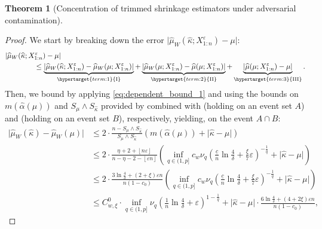 \documentclass{article}
\theoremstyle{plain}
\newtheorem{theorem}{Theorem}[section]
\theoremstyle{definition}
\begin{document}
\begin{appendix}
\begin{theorem}[Concentration of trimmed shrinkage estimators under adversarial contamination]
\end{theorem}
\begin{proof}
  We start by breaking down the error \( \lvert \widehat{\mu }_W(\widehat{\kappa };X_{1:n}^\varepsilon  ) - \mu  \rvert  \):   
  \begin{align*}
    &\lvert \widehat{\mu }_W(\widehat{\kappa };X_{1:n}^\varepsilon  )  -\mu  \rvert  \\
    &\hspace{4em}\le \underbrace{\lvert \widehat{\mu }_W(\widehat{\kappa};X_{1:n}^\varepsilon  ) -   \widehat{\mu }_W(\mu ;X_{1:n}^\varepsilon )  \rvert }_{\hypertarget{term:1}{\text{\MakeUppercase{\romannumeral 1}}}}+ \underbrace{\lvert\widehat{\mu }_W(\mu ;X_{1:n}^\varepsilon ) - \widehat{\mu }(\mu ;X_{1:n}^\varepsilon )  \rvert}_{\hypertarget{term:2}{\text{\MakeUppercase{\romannumeral 2}}}} + \underbrace{\lvert \widehat{\mu }(\mu ; X_{1:n}^\varepsilon ) -\mu  \rvert }_{\hypertarget{term:3}{\text{\MakeUppercase{\romannumeral 3}}}}.
  \end{align*} 
  Then, we bound \hyperlink{1}{} by applying \eqref{eq:dependent_bound_1} and using the bounds on \( m(\widehat{\alpha }(\mu ) ) \) and \( S_\mu \wedge S_{\widehat{\kappa } }  \) provided by  combined with  (holding on an event set \( A \)) and  (holding on an event set \( B \)), respectively, yielding, on the event \( A \cap  B \):
  \begin{align}
    \lvert \widehat{\mu }_W(\widehat{\kappa } ) - \widehat{\mu }_W(\mu )   \rvert &\le 2 \cdot\frac{n-S_{\mu}  \wedge S_{\widehat{\kappa } }}{S_{\mu } \wedge S_{\widehat{\kappa } }}(m(\widehat{\alpha }(\mu  ) )+ \lvert \widehat{\kappa } -\mu  \rvert )\nonumber \\
 &\le 2\cdot\frac{\eta +2 + \left\lfloor n \varepsilon  \right\rfloor}{n-\eta -2-\left\lfloor \varepsilon n \right\rfloor}\left(\inf_{q \in (1,p]} c_w \nu_q \left(\frac{\underline{c} }{n}\ln\frac{4}{\delta}+\frac{\xi}{7}\varepsilon \right)^{-\frac{1}{q}} + \lvert \widehat{\kappa }-\mu   \rvert \right)\nonumber\\
 & \le 2 \cdot \frac{3 \ln \frac{4}{\delta } + (2+\xi )\varepsilon n}{n(1-c_0)}\left(\inf_{q \in (1,p]} c_w \nu_q \left(\frac{\underline{c} }{n}\ln\frac{4}{\delta}+\frac{\xi}{7}\varepsilon \right)^{-\frac{1}{q}} + \lvert \widehat{\kappa }-\mu   \rvert \right)\label{eq:renormalized_sum}\\ 
 & \le C^0_{w,\xi }\cdot\inf_{q \in (1,p]}\nu_q \left(\frac{1}{n}\ln\frac{4}{\delta}+\varepsilon \right)^{1-\frac{1}{q}}  +  \lvert \widehat{\kappa }-\mu   \rvert \cdot \frac{6 \ln \frac{4}{\delta } + (4+2\xi )\varepsilon n}{n(1-c_0)} \nonumber,

\end{align}
\end{proof}
\end{appendix}
\end{document}
